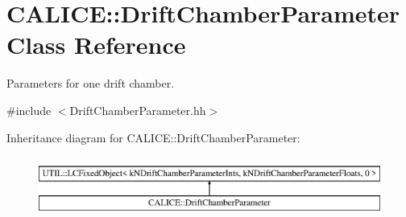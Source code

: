 \section{C\-A\-L\-I\-C\-E\-:\-:Drift\-Chamber\-Parameter Class Reference}
\label{classCALICE_1_1DriftChamberParameter}


Parameters for one drift chamber.  




{\ttfamily \#include $<$Drift\-Chamber\-Parameter.\-hh$>$}

Inheritance diagram for C\-A\-L\-I\-C\-E\-:\-:Drift\-Chamber\-Parameter\-:\begin{figure}[H]
\begin{center}
\leavevmode
\includegraphics[height=2.000000cm]{classCALICE_1_1DriftChamberParameter}
\end{center}
\end{figure}
